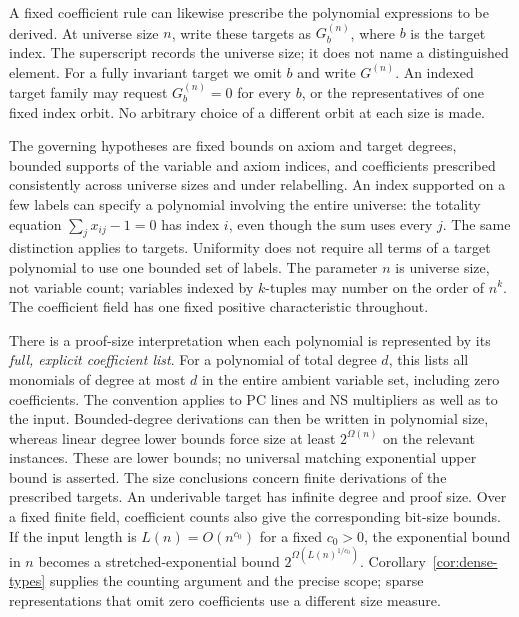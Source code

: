 A fixed coefficient rule can likewise prescribe the polynomial
expressions to be derived. At universe size $n$, write these targets as
$G_b^{(n)}$, where $b$ is the target index. The superscript records the
universe size; it does not name a distinguished element. For a fully
invariant target we omit $b$ and write $G^{(n)}$. An indexed target family
may request $G_b^{(n)}=0$ for every $b$, or the representatives of one
fixed index orbit. No arbitrary choice of a different orbit at each
size is made.

The governing hypotheses are fixed bounds on axiom and target degrees,
bounded supports of the
variable and axiom indices, and coefficients prescribed consistently
across universe sizes and under relabelling. An index supported on a
few labels can specify a polynomial involving the entire universe:
the totality equation $\sum_j x_{ij}-1=0$ has index $i$, even though
the sum uses every $j$. The same distinction applies to targets.
Uniformity does not require all terms of a target polynomial to use
one bounded set of labels. The parameter $n$ is universe size, not
variable count; variables indexed by $k$-tuples may number on the
order of $n^k$. The coefficient field has one fixed positive
characteristic throughout.

There is a proof-size interpretation when each polynomial is represented
by its \emph{full, explicit coefficient list}. For a polynomial of
total degree $d$, this lists all monomials of degree at most $d$ in
the entire ambient variable set, including zero coefficients. The
convention applies to PC lines and NS multipliers as well as to the
input. Bounded-degree derivations can then be written in polynomial
size, whereas linear degree lower bounds force size at least
$2^{\Omega(n)}$ on the relevant instances. These are lower bounds;
no universal matching exponential upper bound is asserted. The size
conclusions concern finite derivations of the prescribed targets.
An underivable target has infinite degree and proof size. Over a fixed
finite field, coefficient counts also give the corresponding bit-size
bounds. If the input length is $L(n)=O(n^{c_0})$ for a fixed $c_0>0$, the exponential bound in
$n$ becomes a stretched-exponential bound
$2^{\Omega(L(n)^{1/c_0})}$. Corollary~\ref{cor:dense-types} supplies the
counting argument and the precise scope; sparse representations that
omit zero coefficients use a different size measure.

